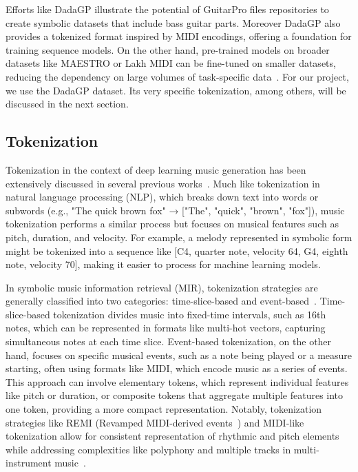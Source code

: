 Efforts like DadaGP illustrate the potential of GuitarPro files repositories to create symbolic datasets that include bass guitar parts.
Moreover DadaGP also provides a tokenized format inspired by MIDI encodings, offering a foundation for training sequence models.
On the other hand, pre-trained models on broader datasets like MAESTRO or Lakh MIDI can be fine-tuned on smaller datasets, reducing the dependency on large volumes of task-specific data~\cite{makris_conditional_2022, sarmento_dadagp_2021}.
For our project, we use the DadaGP dataset. Its very specific tokenization, among others, will be discussed in the next section.


\subsection{Tokenization}

Tokenization in the context of deep learning music generation has been extensively discussed in several previous works~\cite{agarwal_structure-informed_2024, makris_conditional_2022, sarmento_dadagp_2021, hsiao_compound_2021, cournut_encodages_2020}.
Much like tokenization in natural language processing (NLP), which breaks down text into words or subwords (e.g., "The quick brown fox" → ["The", "quick", "brown", "fox"]),
music tokenization performs a similar process but focuses on musical features such as pitch, duration, and velocity.
For example, a melody represented in symbolic form might be tokenized into a sequence like [C4, quarter note, velocity 64, G4, eighth note, velocity 70], making it easier to process for machine learning models.

In symbolic music information retrieval (MIR), tokenization strategies are generally classified into two categories: time-slice-based and event-based~\cite{le_natural_2024}.
Time-slice-based tokenization divides music into fixed-time intervals, such as 16th notes, which can be represented in formats like multi-hot vectors, capturing simultaneous notes at each time slice.
Event-based tokenization, on the other hand, focuses on specific musical events, such as a note being played or a measure starting, often using formats like MIDI, which encode music as a series of events.
This approach can involve elementary tokens, which represent individual features like pitch or duration, or composite tokens that aggregate multiple features into one token, providing a more compact representation.
Notably, tokenization strategies like REMI (Revamped MIDI-derived events~\cite{huang_pop_2020}) and MIDI-like tokenization allow for consistent representation of rhythmic and pitch elements while addressing complexities like polyphony and multiple tracks in multi-instrument music~\cite{le_natural_2024, cournut_encodages_2020}.

